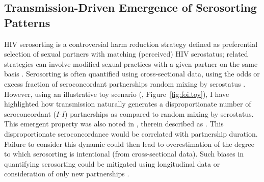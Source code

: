 \subsection{Transmission-Driven Emergence of Serosorting Patterns}\label{foi.disc.ss}
HIV serosorting is a controversial harm reduction strategy defined as
preferential selection of sexual partners with matching (perceived) HIV serostatus;
related strategies can involve modified sexual practices with a given partner on the same basis
\cite{Heymer2010,Cassels2010,Cassels2013}.
Serosorting is often quantified using cross-sectional data,
using the odds or excess fraction of seroconcordant partnerships
\vs random mixing by serostatus \cite{Cassels2009,Wang2020}.
However, using an illustrative toy scenario (, Figure~\ref{fig:foi.toy}),
I have highlighted how transmission naturally generates
a disproportionate number of seroconcordant ($I$-$I$) partnerships
as compared to random mixing by serostatus.
This emergent property was also noted in \cite{Eames2002},
therein described as .
This disproportionate seroconcordance would be correlated with partnership duration.
Failure to consider this dynamic could then lead to
overestimation of the degree to which serosorting is intentional (from cross-sectional data).
Such biases in quantifying serosorting could be mitigated using longitudinal data
or consideration of only new partnerships \cite{Kim2020}.
